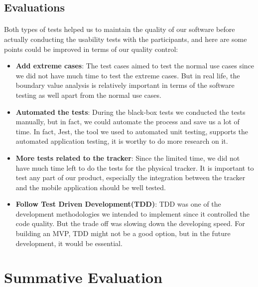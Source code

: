 \documentclass[12pt,a4paper]{article}
\begin{document}
      \subsection{Evaluations} %
        \paragraph{} Both types of tests helped us to maintain the quality of our software before actually conducting the usability tests with the participants, and here are some points could be improved in terms of our quality control:
        \begin{itemize}
          \item {\bf Add extreme cases}: The test cases aimed to test the normal use cases since we did not have much time to test the extreme cases. But in real life, the boundary value analysis is relatively important in terms of the software testing as well apart from the normal use cases.
          \item {\bf Automated the tests}: During the black-box tests we conducted the tests manually, but in fact, we could automate the process and save us a lot of time. In fact, Jest, the tool we used to automated unit testing, supports the automated application testing, it is worthy to do more research on it.
          \item {\bf More tests related to the tracker}: Since the limited time, we did not have much time left to do the tests for the physical tracker. It is important to test any part of our product, especially the integration between the tracker and the mobile application should be well tested.
          \item {\bf Follow Test Driven Development(TDD)}: TDD was one of the development methodologies we intended to implement since it controlled the code quality. But the trade off was slowing down the developing speed. For building an MVP, TDD might not be a good option, but in the future development, it would be essential.
        \end{itemize}
       
    \section{Summative Evaluation}
    
\end{document}
